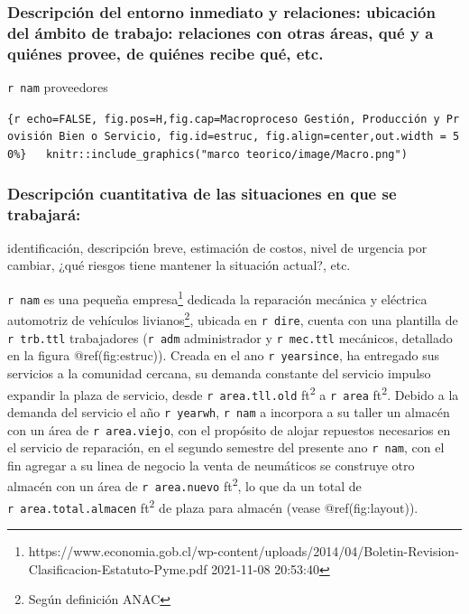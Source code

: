 \documentclass[11pt]{article}
\begin{document}
\hypertarget{descripciuxf3n-del-entorno-inmediato-y-relaciones-ubicaciuxf3n-del-uxe1mbito-de-trabajo-relaciones-con-otras-uxe1reas-quuxe9-y-a-quiuxe9nes-provee-de-quiuxe9nes-recibe-quuxe9-etc.}{%
\subsubsection{Descripción del entorno inmediato y relaciones: ubicación
del ámbito de trabajo: relaciones con otras áreas, qué y a quiénes
provee, de quiénes recibe qué,
etc.}\label{descripciuxf3n-del-entorno-inmediato-y-relaciones-ubicaciuxf3n-del-uxe1mbito-de-trabajo-relaciones-con-otras-uxe1reas-quuxe9-y-a-quiuxe9nes-provee-de-quiuxe9nes-recibe-quuxe9-etc.}}

\texttt{r\ nam} proveedores

\texttt{\{r\ echo=FALSE,\ fig.pos=\textquotesingle{}H\textquotesingle{},fig.cap=\textquotesingle{}Macroproceso\ Gestión,\ Producción\ y\ Provisión\ Bien\ o\ Servicio\textquotesingle{},\ fig.id=\textquotesingle{}estruc\textquotesingle{},\ fig.align=\textquotesingle{}center\textquotesingle{},out.width\ =\ \textquotesingle{}50\%\textquotesingle{}\}\ \ \ knitr::include\_graphics("marco\ teorico/image/Macro.png")}

\hypertarget{descripciuxf3n-cuantitativa-de-las-situaciones-en-que-se-trabajaruxe1}{%
\subsubsection{Descripción cuantitativa de las situaciones en que se
trabajará:}\label{descripciuxf3n-cuantitativa-de-las-situaciones-en-que-se-trabajaruxe1}}

identificación, descripción breve, estimación de costos, nivel de
urgencia por cambiar, ¿qué riesgos tiene mantener la situación actual?,
etc.

\texttt{r\ nam} es una pequeña empresa\footnote{https://www.economia.gob.cl/wp-content/uploads/2014/04/Boletin-Revision-Clasificacion-Estatuto-Pyme.pdf
  2021-11-08 20:53:40} dedicada la reparación mecánica y eléctrica
automotriz de vehículos livianos\footnote{Según definición ANAC},
ubicada en \texttt{r\ dire}, cuenta con una plantilla de
\texttt{r\ trb.ttl} trabajadores (\texttt{r\ adm} administrador y
\texttt{r\ mec.ttl} mecánicos, detallado en la figura @ref(fig:estruc)).
Creada en el ano \texttt{r\ yearsince}, ha entregado sus servicios a la
comunidad cercana, su demanda constante del servicio impulso expandir la
plaza de servicio, desde \texttt{r\ area.tll.old} ft\textsuperscript{2}
a \texttt{r\ area} ft\textsuperscript{2}. Debido a la demanda del
servicio el año \texttt{r\ yearwh}, \texttt{r\ nam} a incorpora a su
taller un almacén con un área de \texttt{r\ area.viejo}, con el
propósito de alojar repuestos necesarios en el servicio de reparación,
en el segundo semestre del presente ano \texttt{r\ nam}, con el fin
agregar a su linea de negocio la venta de neumáticos se construye otro
almacén con un área de \texttt{r\ area.nuevo} ft\textsuperscript{2}, lo
que da un total de \texttt{r\ area.total.almacen} ft\textsuperscript{2}
de plaza para almacén (vease @ref(fig:layout)).
\end{document}
